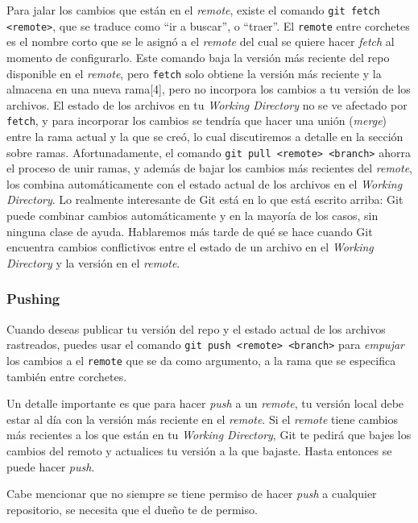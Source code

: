 \documentclass[spanish, 12pt, a4paper]{article}
\begin{document}
Para jalar los cambios que están en el \emph{remote}, existe el comando
\passthrough{\lstinline!git fetch <remote>!}, que se traduce como ``ir a
buscar'', o ``traer''. El \passthrough{\lstinline!remote!} entre
corchetes es el nombre corto que se le asignó a el \emph{remote} del
cual se quiere hacer \emph{fetch} al momento de configurarlo. Este
comando baja la versión más reciente del repo disponible en el
\emph{remote}, pero \passthrough{\lstinline!fetch!} solo obtiene la
versión más reciente y la almacena en una nueva rama{[}4{]}, pero no
incorpora los cambios a tu versión de los archivos. El estado de los
archivos en tu \emph{Working Directory} no se ve afectado por
\passthrough{\lstinline!fetch!}, y para incorporar los cambios se
tendría que hacer una unión (\emph{merge}) entre la rama actual y la que
se creó, lo cual discutiremos a detalle en la sección sobre ramas.
Afortunadamente, el comando
\passthrough{\lstinline!git pull <remote> <branch>!} ahorra el proceso
de unir ramas, y además de bajar los cambios más recientes del
\emph{remote}, los combina automáticamente con el estado actual de los
archivos en el \emph{Working Directory}. Lo realmente interesante de Git
está en lo que está escrito arriba: Git puede combinar cambios
automáticamente y en la mayoría de los casos, sin ninguna clase de
ayuda. Hablaremos más tarde de qué se hace cuando Git encuentra cambios
conflictivos entre el estado de un archivo en el \emph{Working
Directory} y la versión en el \emph{remote}.

\subsubsection{Pushing}

Cuando deseas publicar tu versión del repo y el estado actual de los
archivos rastreados, puedes usar el comando
\passthrough{\lstinline!git push <remote> <branch>!} para \emph{empujar}
los cambios a el \passthrough{\lstinline!remote!} que se da como
argumento, a la rama que se especifica también entre corchetes.

Un detalle importante es que para hacer \emph{push} a un \emph{remote},
tu versión local debe estar al día con la versión más reciente en el
\emph{remote}. Si el \emph{remote} tiene cambios más recientes a los que
están en tu \emph{Working Directory}, Git te pedirá que bajes los
cambios del remoto y actualices tu versión a la que bajaste. Hasta
entonces se puede hacer \emph{push}.

Cabe mencionar que no siempre se tiene permiso de hacer \emph{push} a
cualquier repositorio, se necesita que el dueño te de permiso.
\end{document}
